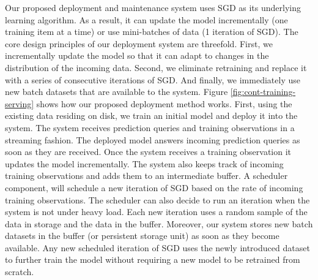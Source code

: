 \documentclass{vldb}
\begin{document}
Our proposed deployment and maintenance system uses SGD as its underlying learning algorithm.
As a result, it can update the model incrementally (one training item at a time) or use mini-batches of data (1 iteration of SGD).
The core design principles of our deployment system are threefold.
First, we incrementally update the model so that it can adapt to changes in the distribution of the incoming data.
Second, we eliminate retraining and replace it with a series of consecutive iterations of SGD.
And finally, we immediately use new batch datasets that are available to the system.
Figure \ref{fig:cont-training-serving} shows how our proposed deployment method works.
First, using the existing data residing on disk, we train an initial model and deploy it into the system.
The system receives prediction queries and training observations in a streaming fashion.
The deployed model answers incoming prediction queries as soon as they are received.
Once the system receives a training observation it updates the model incrementally.
The system also keeps track of incoming training observations and adds them to an intermediate buffer.
A scheduler component, will schedule a new iteration of SGD based on the rate of incoming training observations. 
The scheduler can also decide to run an iteration when the system is not under heavy load.
Each new iteration uses a random sample of the data in storage and the data in the buffer. 
Moreover, our system stores new batch datasets in the buffer (or persistent storage unit) as soon as they become available.
Any new scheduled iteration of SGD uses the newly introduced dataset to further train the model without requiring a new model to be retrained from scratch.
\end{document}
